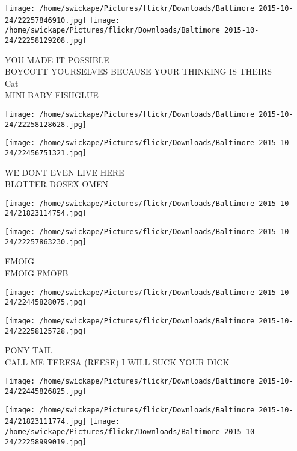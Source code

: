 \documentclass[10pt,letterpaper]{article}
\begin{document}
\texttt{[image: /home/swickape/Pictures/flickr/Downloads/Baltimore 2015-10-24/22257846910.jpg]}
\texttt{[image: /home/swickape/Pictures/flickr/Downloads/Baltimore 2015-10-24/22258129208.jpg]}

YOU MADE IT POSSIBLE\\
BOYCOTT YOURSELVES BECAUSE YOUR THINKING IS THEIRS\\
Cat\\
MINI BABY FISHGLUE\\
\pagebreak

\texttt{[image: /home/swickape/Pictures/flickr/Downloads/Baltimore 2015-10-24/22258128628.jpg]}

\vspace{0.25in}
\texttt{[image: /home/swickape/Pictures/flickr/Downloads/Baltimore 2015-10-24/22456751321.jpg]}

WE DONT EVEN LIVE HERE\\
BLOTTER DOSEX OMEN\\
\pagebreak

\texttt{[image: /home/swickape/Pictures/flickr/Downloads/Baltimore 2015-10-24/21823114754.jpg]}

\vspace{0.25in}
\texttt{[image: /home/swickape/Pictures/flickr/Downloads/Baltimore 2015-10-24/22257863230.jpg]}

FMOIG\\
FMOIG FMOFB\\
\pagebreak

\texttt{[image: /home/swickape/Pictures/flickr/Downloads/Baltimore 2015-10-24/22445828075.jpg]}

\vspace{0.25in}
\texttt{[image: /home/swickape/Pictures/flickr/Downloads/Baltimore 2015-10-24/22258125728.jpg]}

PONY TAIL\\
CALL ME TERESA (REESE) I WILL SUCK YOUR DICK\\
\pagebreak

\texttt{[image: /home/swickape/Pictures/flickr/Downloads/Baltimore 2015-10-24/22445826825.jpg]}

\vspace{0.25in}
\texttt{[image: /home/swickape/Pictures/flickr/Downloads/Baltimore 2015-10-24/21823111774.jpg]}
\texttt{[image: /home/swickape/Pictures/flickr/Downloads/Baltimore 2015-10-24/22258999019.jpg]}
\end{document}
